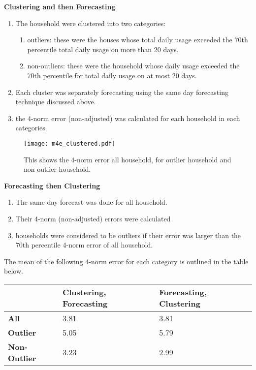 \documentclass[a4paper]{article}
\begin{document}
\textbf{Clustering and then Forecasting} 
\begin{enumerate}
\item The household were clustered into two categories:
\begin{enumerate}
\item outliers: these were the houses whose total daily usage exceeded the 70th percentile total daily usage on more than 20 days.
\item non-outliers: these were the household whose daily usage exceeded the 70th percentile for total daily usage on at most 20 days.
\end{enumerate}
\item Each cluster was separately forecasting using the same day forecasting technique discussed above.
\item the 4-norm error (non-adjusted) was calculated for each household in each categories.
\end{enumerate} 

\begin{figure}
\centering
\texttt{[image: m4e\_clustered.pdf]}
\caption{\label{fig:clustering} This shows the 4-norm error all household, for outlier household and non outlier household.}
\end{figure}

\textbf{Forecasting then Clustering} 
\begin{enumerate}
\item The same day forecast was done for all household.
\item Their 4-norm (non-adjusted) errors were calculated
\item households were considered to be outliers if their error was larger than the 70th percentile 4-norm error of all household.
\end{enumerate}

The mean of the following 4-norm error for each category is outlined in the table below. \newline

\begin{tabular}{|l|l||l|}
\hline
 & \textbf{Clustering, Forecasting} & \textbf{Forecasting, Clustering}\\
\hline
\textbf{All} & 3.81 & 3.81\\
\hline
\textbf{Outlier} & 5.05 & 5.79\\
\hline
\textbf{Non-Outlier} & 3.23 & 2.99\\
\hline
\end{tabular}
\end{document}
